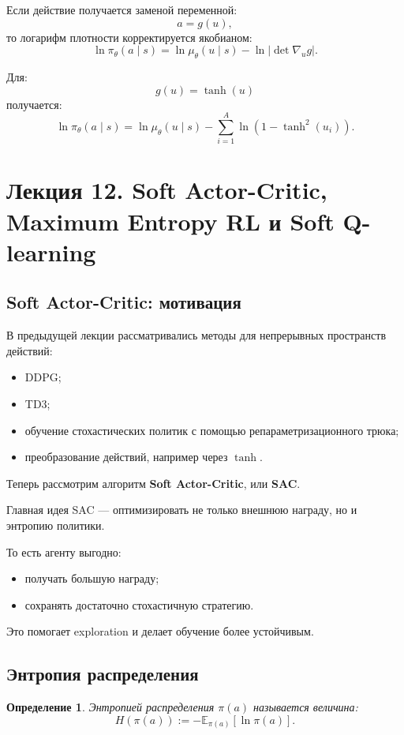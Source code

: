 \documentclass[12pt,a4paper]{article}
\newtheorem{definition}{Определение}
\begin{document}
Если действие получается заменой переменной:
\[
a=g(u),
\]
то логарифм плотности корректируется якобианом:
\[
\ln \pi_\theta(a\mid s)
=
\ln \mu_\theta(u\mid s)
-
\ln
\left|
\det\nabla_u g
\right|.
\]

Для:
\[
g(u)=\tanh(u)
\]
получается:
\[
\ln \pi_\theta(a\mid s)
=
\ln \mu_\theta(u\mid s)
-
\sum_{i=1}^{A}
\ln
\left(
1-\tanh^2(u_i)
\right).
\]

\section{Лекция 12. Soft Actor-Critic, Maximum Entropy RL и Soft Q-learning}

\subsection{Soft Actor-Critic: мотивация}

В предыдущей лекции рассматривались методы для непрерывных пространств действий:
\begin{itemize}
    \item DDPG;
    \item TD3;
    \item обучение стохастических политик с помощью репараметризационного трюка;
    \item преобразование действий, например через $\tanh$.
\end{itemize}

Теперь рассмотрим алгоритм \textbf{Soft Actor-Critic}, или \textbf{SAC}.

Главная идея SAC --- оптимизировать не только внешнюю награду, но и энтропию политики.

То есть агенту выгодно:
\begin{itemize}
    \item получать большую награду;
    \item сохранять достаточно стохастичную стратегию.
\end{itemize}

Это помогает exploration и делает обучение более устойчивым.

\subsection{Энтропия распределения}

\begin{definition}
Энтропией распределения $\pi(a)$ называется величина:
\[
H(\pi(a))
:=
-
\mathbb E_{\pi(a)}
\left[
\ln \pi(a)
\right].
\]
\end{definition}
\end{document}
